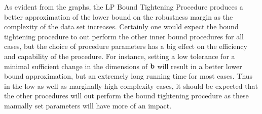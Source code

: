 As evident from the graphs, the LP Bound Tightening Procedure produces a better approximation of the lower bound on the robustness margin as the complexity of the data set increases. 
Certainly one would expect the bound tightening procedure to out perform the other inner bound procedures for all cases, but the choice of procedure parameters has a big effect on the efficiency and capability of the procedure. 
For instance, setting a low tolerance for a minimal sufficient change in the dimensions of $\mathbf{b}$ will result in a better lower bound approximation, but an extremely long running time for most cases. 
Thus in the low as well as marginally high complexity cases, it should be expected that the other procedures will out perform the bound tightening procedure as these manually set parameters will have more of an impact. 



